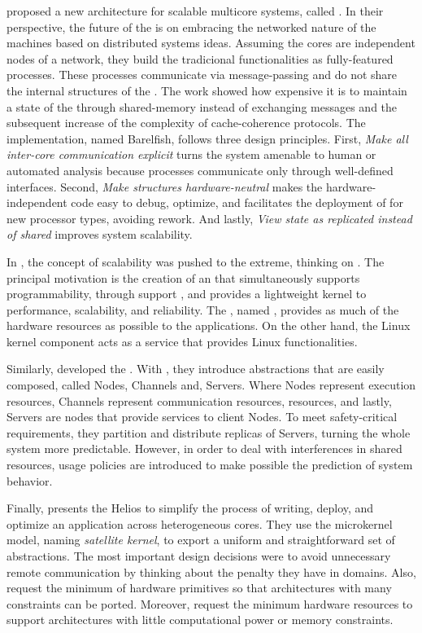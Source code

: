 	 proposed a new \os architecture for scalable multicore
	systems, called \multikernel.
	In their perspective, the future of the \oss is on embracing the networked nature
	of the machines based on distributed systems ideas.
	Assuming the cores are independent nodes of a network, they build the tradicional
	\os functionalities as fully-featured processes.
	These processes communicate via message-passing and do not share the internal
	structures of the \os.
	The work showed how expensive it is to maintain a state of the \os through
	shared-memory instead of exchanging messages and the subsequent increase of
	the complexity of cache-coherence protocols.
	The \multikernel implementation, named Barelfish, follows three design principles.
	First, \textit{Make all inter-core communication explicit} turns the system
	amenable to human or automated analysis because processes communicate only
	through well-defined interfaces.
	Second, \textit{Make \os structures hardware-neutral} makes the hardware-independent
	code easy to debug, optimize, and facilitates the deployment of \os for new
	processor types, avoiding rework.
	And lastly, \textit{View \os state as replicated instead of shared} improves system
	scalability.

	In  \etal, the concept of scalability was pushed
	to the extreme, thinking on \hpc.
	The principal motivation is the creation of an \os that simultaneously supports
	programmability, through support \linux \api, and provides a lightweight kernel
	to performance, scalability, and reliability.
	The \os, named \mos, provides as much of the hardware resources as
	possible to the \hpc applications.
	On the other hand, the Linux kernel
	component acts as a service that provides Linux functionalities.

	Similarly,  developed the \moosca.
	With \moosca, they introduce abstractions that are easily composed, called Nodes,
	Channels and, Servers.
	Where Nodes represent execution resources, Channels represent communication
	resources, \eg \noc resources, and lastly, Servers are nodes that provide
	services to client Nodes.
	To meet safety-critical requirements, they partition \manycore and distribute
	replicas of Servers, turning the whole system more predictable.
	However, in order to deal with interferences in shared resources,
	usage policies are introduced to make possible the prediction of system behavior.

	Finally,  presents the Helios \os to
	simplify the process of writing, deploy, and optimize an application across
	heterogeneous cores.
	They use the microkernel model, naming \textit{satellite kernel}, to export
	a uniform and straightforward set of \os abstractions.
	The most important design decisions were to avoid unnecessary remote communication
	by thinking about the penalty they have in \numa domains.
	Also, request the minimum of hardware primitives so that architectures with many
	constraints can be ported.
	Moreover, request the minimum hardware resources to support architectures with little
	computational power or memory constraints.

